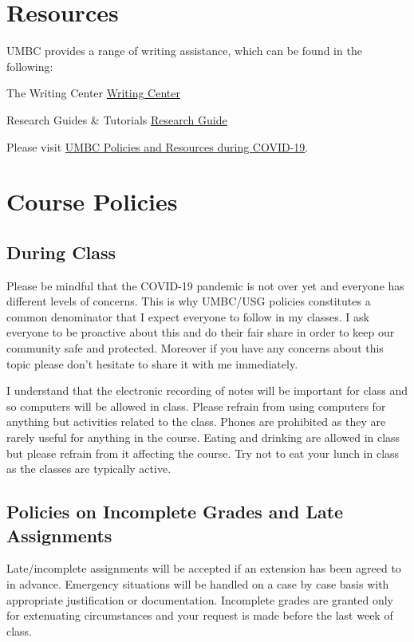 \documentclass[11pt]{article}
\begin{document}
\newpage

\section*{Resources}
UMBC provides a range of writing assistance, which can be found in the following:

The Writing Center \href{https://lrc.umbc.edu/tutor/writing-center/ }{Writing Center}

Research Guides \& Tutorials \href{https://lib.guides.umbc.edu/tutorial}{Research Guide} 

Please visit \href{https://covid19.umbc.edu/}{ UMBC Policies and Resources during COVID-19}.



\section*{Course Policies}

\subsection*{During Class}

\footnotesize{ Please be mindful that the COVID-19 pandemic is not over yet and everyone has different levels of concerns. This is why UMBC/USG policies constitutes a common denominator that I expect everyone to follow in my classes. I ask everyone to be proactive about this and do their fair share in order to keep our community safe and protected. Moreover if you have any concerns about this topic please don't hesitate to share it with me immediately.}

\footnotesize{I understand that the electronic recording of notes will be important for class and so computers will be allowed in class. Please refrain from using computers for anything but activities related to the class. Phones are prohibited as they are rarely useful for anything in the course. Eating and drinking are allowed in class but please refrain from it affecting the course. Try not to eat your lunch in class as the classes are typically active.}

\subsection*{Policies on Incomplete Grades and Late Assignments}
Late/incomplete assignments will be accepted if an extension has been agreed to in advance. Emergency situations will be handled on a case by case basis with appropriate justification or documentation.
\newline 
Incomplete grades are granted only for extenuating circumstances and your request is made before the last week of class.
\end{document}
